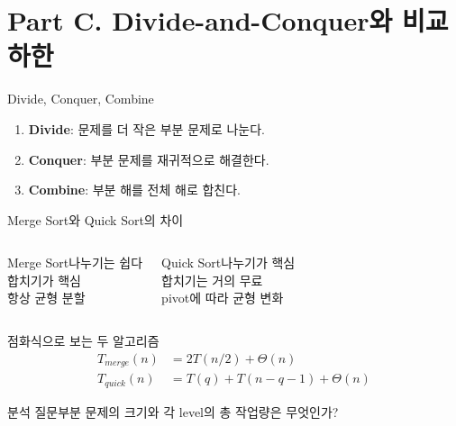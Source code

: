 \section{Part C. Divide-and-Conquer와 비교 하한}
\begin{frame}{Divide, Conquer, Combine}
\begin{enumerate}\item \textbf{Divide}: 문제를 더 작은 부분 문제로 나눈다.\item \textbf{Conquer}: 부분 문제를 재귀적으로 해결한다.\item \textbf{Combine}: 부분 해를 전체 해로 합친다.\end{enumerate}
\end{frame}
\begin{frame}{Merge Sort와 Quick Sort의 차이}
\begin{columns}[T]\begin{block}{Merge Sort}\centering 나누기는 쉽다\\\alert{합치기}가 핵심\\항상 균형 분할\end{block}\begin{block}{Quick Sort}\centering \alert{나누기}가 핵심\\합치기는 거의 무료\\pivot에 따라 균형 변화\end{block}\end{columns}
\end{frame}
\begin{frame}{점화식으로 보는 두 알고리즘}
\begin{align*}T_{merge}(n)&=2T(n/2)+\Theta(n)\\T_{quick}(n)&=T(q)+T(n-q-1)+\Theta(n)\end{align*}
\begin{block}{분석 질문}부분 문제의 \alert{크기}와 각 level의 \alert{총 작업량}은 무엇인가?\end{block}
\end{frame}
